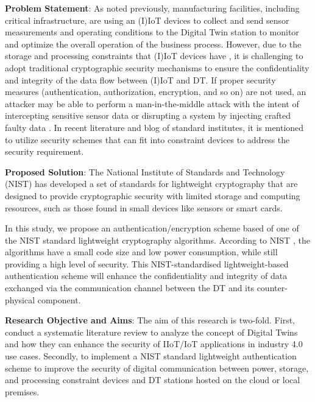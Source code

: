 \textbf{Problem Statement}:
As noted previously, manufacturing facilities, including critical infrastructure, are using an (I)IoT devices to collect and send sensor measurements and operating conditions to the Digital Twin station to monitor and optimize the overall operation of the business process. However, due to the storage and processing constraints that (I)IoT devices have \cite{williams_survey_2022,noauthor_lightweight_nodate}, it is challenging to adopt traditional cryptographic security mechanisms to ensure the confidentiality and integrity of the data flow between (I)IoT and DT. If proper security measures (authentication, authorization, encryption, and so on) are not used, an attacker may be able to perform a man-in-the-middle attack with the intent of intercepting sensitive sensor data or disrupting a system by injecting crafted faulty data \cite{salimBlockchainEnabledSecureDigital2022}. In recent literature and blog of standard institutes, it is mentioned to utilize security schemes that can fit into constraint devices to address the security requirement.  

\textbf{Proposed Solution}:
The National Institute of Standards and Technology (NIST) has developed a set of standards for lightweight cryptography that are designed to provide cryptographic security with limited storage and computing resources, such as those found in small devices like sensors or smart cards.

In this study, we propose an authentication/encryption scheme based of one of the NIST standard lightweight cryptography algorithms. According to NIST \cite{noauthor_lightweight_nodate}, the algorithms have a small code size and low power consumption, while still providing a high level of security.  This NIST-standardised lightweight-based authentication scheme will enhance the confidentiality and integrity of data exchanged via the communication channel between the DT and its counter-physical component.


\textbf{Research Objective and Aims}:
The aim of this research is two-fold. First, conduct a systematic literature review to analyze the concept of Digital Twins and how they can enhance the security of IIoT/IoT applications in industry 4.0 use cases. Secondly, to implement a NIST standard lightweight authentication scheme to improve the security of digital communication between power, storage, and processing constraint devices and DT stations hosted on the cloud or local premises.


